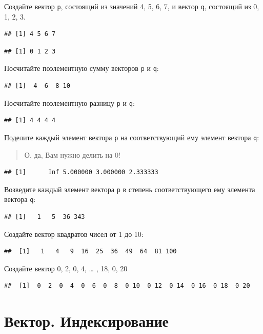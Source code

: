\documentclass[]{book}
\begin{document}
Создайте вектор \texttt{p}, состоящий из значений 4, 5, 6, 7, и вектор
\texttt{q}, состоящий из 0, 1, 2, 3.

\begin{verbatim}
## [1] 4 5 6 7
\end{verbatim}

\begin{verbatim}
## [1] 0 1 2 3
\end{verbatim}

Посчитайте поэлементную сумму векторов \texttt{p} и \texttt{q}:

\begin{verbatim}
## [1]  4  6  8 10
\end{verbatim}

Посчитайте поэлементную разницу \texttt{p} и \texttt{q}:

\begin{verbatim}
## [1] 4 4 4 4
\end{verbatim}

Поделите каждый элемент вектора \texttt{p} на соответствующий ему
элемент вектора \texttt{q}:

\begin{quote}
О, да, Вам нужно делить на 0!
\end{quote}

\begin{verbatim}
## [1]      Inf 5.000000 3.000000 2.333333
\end{verbatim}

Возведите каждый элемент вектора \texttt{p} в степень соответствующего
ему элемента вектора \texttt{q}:

\begin{verbatim}
## [1]   1   5  36 343
\end{verbatim}

Создайте вектор квадратов чисел от 1 до 10:

\begin{verbatim}
##  [1]   1   4   9  16  25  36  49  64  81 100
\end{verbatim}

Создайте вектор 0, 2, 0, 4, \ldots{} , 18, 0, 20

\begin{verbatim}
##  [1]  0  2  0  4  0  6  0  8  0 10  0 12  0 14  0 16  0 18  0 20
\end{verbatim}

\section{Вектор. Индексирование}\label{vec_task_2}
\end{document}
